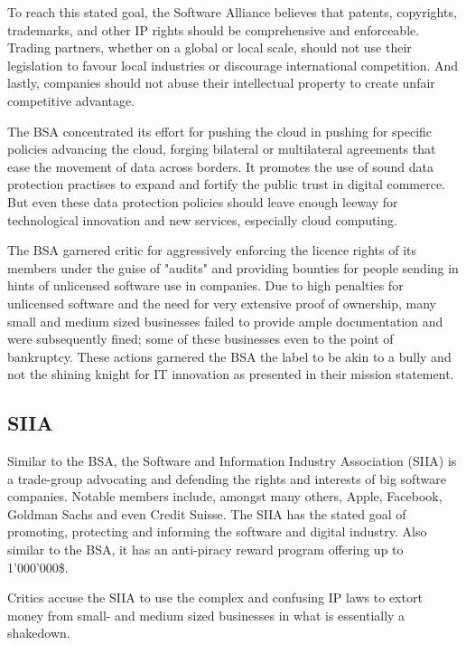 \documentclass[a4paper]{report}
\begin{document}
To reach this stated goal, the Software Alliance believes that patents, copyrights, trademarks, and other IP rights should be comprehensive and enforceable. Trading partners, whether on a global or local scale, should not use their legislation to favour local industries or discourage international competition. And lastly, companies should not abuse their intellectual property to create unfair competitive advantage.

The BSA concentrated its effort for pushing the cloud in pushing for specific policies advancing the cloud, forging bilateral or multilateral agreements that ease the movement of data across borders. It promotes the use of sound data protection practises to expand and fortify the public trust in digital commerce. But even these data protection policies should leave enough leeway for technological innovation and new services, especially cloud computing.

The BSA garnered critic for aggressively enforcing the licence rights of its members under the guise of "audits" and providing bounties for people sending in hints of unlicensed software use in companies. Due to high penalties for unlicensed software and the need for very extensive proof of ownership, many small and medium sized businesses failed to provide ample documentation and were subsequently fined; some of these businesses even to the point of bankruptcy. These actions garnered the BSA the label to be akin to a bully and not the shining knight for IT innovation as presented in their mission statement. \parencite{Gaskin2009}

\subsection{SIIA}
\label{ssec:SIIA}
Similar to the BSA, the Software and Information Industry Association (SIIA) is a trade-group advocating and defending the rights and interests of big software companies. Notable members include, amongst many others, Apple, Facebook, Goldman Sachs and even Credit Suisse. The SIIA has the stated goal of promoting, protecting and informing the software and digital industry. Also similar to the BSA, it has an anti-piracy reward program offering up to 1'000'000\$. \parencite{SIIAreward}

Critics accuse the SIIA to use the complex and confusing IP laws to extort money from small- and medium sized businesses in what is essentially a shakedown. \parencite{Melymuka2006}
\end{document}
